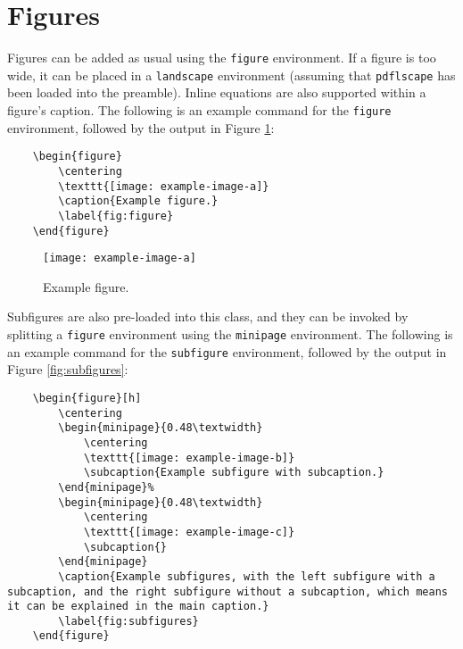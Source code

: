 \documentclass{umalayathesis}
\begin{document}
\section{Figures}

Figures can be added as usual using the \texttt{figure} environment. If a figure is too wide, it can be placed in a \texttt{landscape} environment (assuming that \texttt{pdflscape} has been loaded into the preamble). Inline equations are also supported within a figure's caption. The following is an example command for the \texttt{figure} environment, followed by the output in Figure \ref{fig:figure}: 

\begin{verbatim}
    \begin{figure}
        \centering
        \texttt{[image: example-image-a]}
        \caption{Example figure.}
        \label{fig:figure}
    \end{figure}
\end{verbatim}

\begin{figure}[h]
    \centering
    \texttt{[image: example-image-a]}
    \caption{Example figure.}
    \label{fig:figure}
\end{figure}

Subfigures are also pre-loaded into this class, and they can be invoked by splitting a \texttt{figure} environment using the \texttt{minipage} environment. The following is an example command for the \texttt{subfigure} environment, followed by the output in Figure \ref{fig:subfigures}:

\begin{verbatim}
    \begin{figure}[h]
        \centering
        \begin{minipage}{0.48\textwidth}
            \centering
            \texttt{[image: example-image-b]}
            \subcaption{Example subfigure with subcaption.}
        \end{minipage}%
        \begin{minipage}{0.48\textwidth}
            \centering
            \texttt{[image: example-image-c]}
            \subcaption{}
        \end{minipage}
        \caption{Example subfigures, with the left subfigure with a subcaption, and the right subfigure without a subcaption, which means it can be explained in the main caption.}
        \label{fig:subfigures}
    \end{figure}
\end{verbatim}
\end{document}
